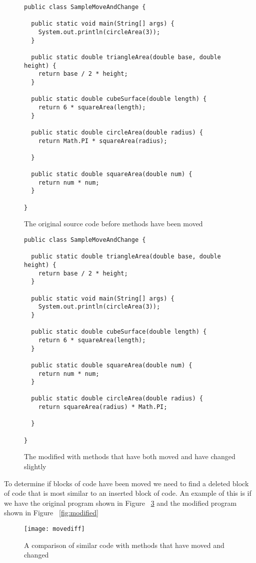 \begin{figure}[!t]
\begin{lstlisting}
public class SampleMoveAndChange {

  public static void main(String[] args) {
    System.out.println(circleArea(3));
  }

  public static double triangleArea(double base, double height) {
    return base / 2 * height;
  }

  public static double cubeSurface(double length) {
    return 6 * squareArea(length);
  }

  public static double circleArea(double radius) {
    return Math.PI * squareArea(radius);

  }

  public static double squareArea(double num) {
    return num * num;
  }

}
\end{lstlisting}
\caption{The original source code before methods have been moved}
 \label{fig:orig}
\end{figure}

\begin{figure}[!t]
\begin{lstlisting}
public class SampleMoveAndChange {

  public static double triangleArea(double base, double height) {
    return base / 2 * height;
  }

  public static void main(String[] args) {
    System.out.println(circleArea(3));
  }

  public static double cubeSurface(double length) {
    return 6 * squareArea(length);
  }

  public static double squareArea(double num) {
    return num * num;
  }

  public static double circleArea(double radius) {
    return squareArea(radius) * Math.PI;

  }

}
\end{lstlisting}
\caption{The modified with methods that have both moved and have changed slightly}
 \label{fig:orig}
\end{figure}


To determine if blocks of code have been moved we need to find a deleted block of code that is most similar to an inserted block of code.  An example of this is if we have the original program shown in Figure ~\ref{fig:orig} and the modified program shown in Figure ~\ref{fig:modified}

\begin{figure}[!t]
\begin{center}
 \texttt{[image: movediff]}
 \end{center}
\caption{A comparison of similar code with methods that have moved and changed}
 \label{fig:orig}
\end{figure}



